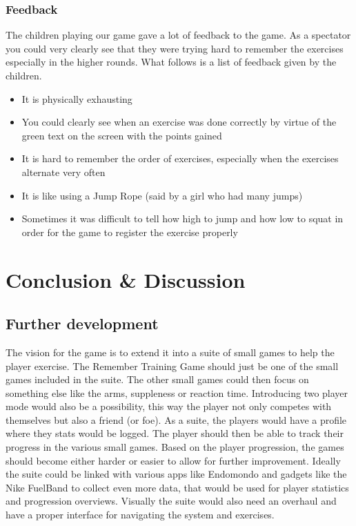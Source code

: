 \documentclass[11pt]{report}
\begin{document}
\subsection{Feedback}
The children playing our game gave a lot of feedback to the game. As a spectator you could very clearly see that they were trying hard to remember the exercises especially in the higher rounds. What follows is a list of feedback given by the children.
\begin{itemize}
\item It is physically exhausting
\item You could clearly see when an exercise was done correctly by virtue of the green text on the screen with the points gained
\item It is hard to remember the order of exercises, especially when the exercises alternate very often
\item It is like using a Jump Rope (said by a girl who had many jumps)
\item Sometimes it was difficult to tell how high to jump and how low to squat in order for the game to register the exercise properly
\end{itemize}

\chapter{Conclusion \& Discussion}


\section{Further development}
The vision for the game is to extend it into a suite of small games to help the player exercise. The Remember Training Game should just be one of the small games included in the suite. The other small games could then focus on something else like the arms, suppleness or reaction time. Introducing two player mode would also be a possibility, this way the player not only competes with themselves but also a friend (or foe). As a suite, the players would have a profile where they stats would be logged. The player should then be able to track their progress in the various small games. Based on the player progression, the games should become either harder or easier to allow for further improvement. Ideally the suite could be linked with various apps like Endomondo and gadgets like the Nike FuelBand to collect even more data, that would be used for player statistics and progression overviews. Visually the suite would also need an overhaul and have a proper interface for navigating the system and exercises.
\end{document}
